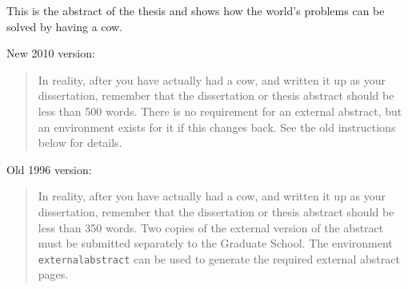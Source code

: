 
This is the abstract of the thesis and shows how the world's problems
can be solved by having a cow.

New 2010 version:
\begin{quote}
In reality, after you have actually had a cow, and written it up as
your dissertation, remember that the dissertation or thesis abstract should be
less than 500 words. There is no requirement for an external abstract,
but an environment exists for it if this changes back. See the old
instructions below for details.
\end{quote}

Old 1996 version:
\begin{quote}
In reality, after you have actually had a cow, and written it up as
your dissertation, remember that the dissertation or thesis abstract should be
less than 350 words.  Two copies of the external version of the abstract
must be submitted separately to the Graduate School.  The environment {\tt
externalabstract} can be used to generate the required external abstract pages.
\end{quote}

